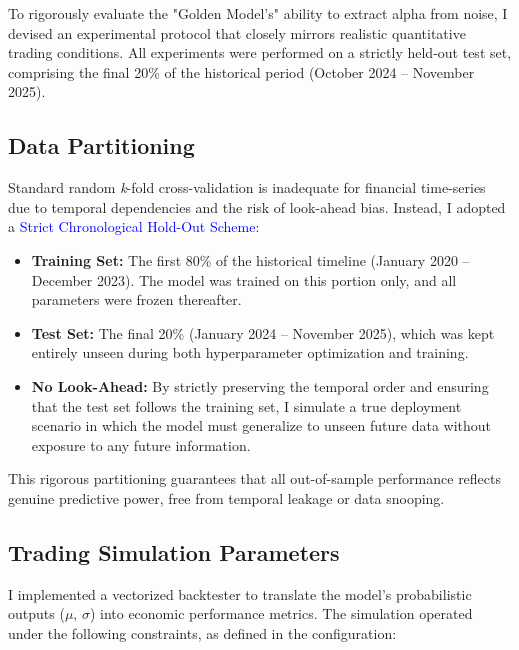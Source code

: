 \documentclass[twoside,final]{hcmut-report}
\begin{document}
To rigorously evaluate the "Golden Model’s" ability to extract alpha from noise, I devised an experimental protocol that closely mirrors realistic quantitative trading conditions. All experiments were performed on a strictly held-out test set, comprising the final 20\% of the historical period (October 2024 -- November 2025).

\subsection{Data Partitioning}
\label{section:exp_partition_holdout}

Standard random \textit{k}-fold cross-validation is inadequate for financial time-series due to temporal dependencies and the risk of look-ahead bias. Instead, I adopted a \textcolor{blue}{Strict Chronological Hold-Out Scheme}:
\begin{itemize}
  \item \textbf{Training Set:} The first 80\% of the historical timeline (January 2020 -- December 2023). The model was trained on this portion only, and all parameters were frozen thereafter.
  \item \textbf{Test Set:} The final 20\% (January 2024 -- November 2025), which was kept entirely unseen during both hyperparameter optimization and training.
  \item \textbf{No Look-Ahead:} By strictly preserving the temporal order and ensuring that the test set follows the training set, I simulate a true deployment scenario in which the model must generalize to unseen future data without exposure to any future information.
\end{itemize}
This rigorous partitioning guarantees that all out-of-sample performance reflects genuine predictive power, free from temporal leakage or data snooping.

\subsection{Trading Simulation Parameters}
\label{section:exp_simulation}

I implemented a vectorized backtester to translate the model's probabilistic outputs ($\mu,\,\sigma$) into economic performance metrics. The simulation operated under the following constraints, as defined in the configuration:
\end{document}
